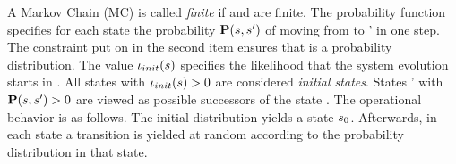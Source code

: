 \documentclass[preview]{standalone}
\begin{document}
A Markov Chain (MC) \autm is called \emph{finite} if \states and \atomicprops are finite. 
The probability function \probtfunc specifies for each state \state the probability ${\textbf{P}}({s},{s}')$ of moving from \state to \state' in one step. The constraint put on \probtfunc in the second item ensures that \probtfunc is a probability distribution. The value ${\iota_{init}}({s})$ specifies the likelihood that the system evolution starts in \state. All states \state with ${\iota_{init}}({s}) > 0$ are  considered \emph{initial states}. States \state' with ${\textbf{P}}({s}, {s}') > 0$ are viewed as possible successors of the state \state. The operational behavior is as follows. The initial distribution \initdistrib yields a state ${s}_0$. Afterwards, in each state a transition is yielded at random according to the probability distribution \probtfunc in that state.

%
\end{document}
